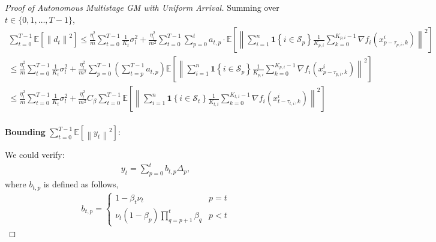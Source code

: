 \begin{proof}[Proof of Autonomous Multistage GM with Uniform Arrival]
Summing over $t\in\{0,1,\dots,T-1\}$,
\begin{equation}
\begin{gathered}
\sum_{t=0}^{T-1}\mathbb{E}\left[\left\| d_t\right\|^2\right] \leq
\frac{\eta_l^2}{m}\sum_{t=0}^{T-1}\frac{1}{K_t}\sigma^2_l + \frac{\eta_l^2}{m^2}\sum_{t=0}^{T-1} \sum_{p=0}^t a_{t,p} \cdot \mathbb{E}\left[\left\| \sum_{i=1}^n\mathbf{1}\left\{i\in\mathcal{S}_p\right\} \frac{1}{K_{p,i}} \sum_{k=0}^{K_{p,i}-1}  \nabla f_i(x_{p-\tau_{p,i},k}^i) \right\|^2\right] \\
\leq \frac{\eta_l^2}{m}\sum_{t=0}^{T-1}\frac{1}{K_t}\sigma^2_l + \frac{\eta_l^2}{m^2} \sum_{p=0}^{T-1}\left(\sum_{t=p}^{T-1}a_{t,p}\right) \mathbb{E}\left[\left\| \sum_{i=1}^n\mathbf{1}\left\{i\in\mathcal{S}_p\right\} \frac{1}{K_{p,i}} \sum_{k=0}^{K_{p,i}-1}  \nabla f_i(x_{p-\tau_{p,i},k}^i) \right\|^2\right]\\
\leq \frac{\eta_l^2}{m}\sum_{t=0}^{T-1}\frac{1}{K_t}\sigma^2_l + \frac{\eta_l^2}{m^2} C_\beta \sum_{t=0}^{T-1} \mathbb{E}\left[\left\| \sum_{i=1}^n\mathbf{1}\left\{i\in\mathcal{S}_t\right\} \frac{1}{K_{t,i}} \sum_{k=0}^{K_{t,i}-1}  \nabla f_i(x_{t-\tau_{t,i},k}^i) \right\|^2\right]\\
\end{gathered}\nonumber
\end{equation}

\textbf{Bounding} $\sum_{t=0}^{T-1}\mathbb{E}\left[\left\| y_t\right\|^2\right]$:

We could verify:
\begin{equation}
\begin{gathered}
 y_t = \sum_{p=0}^t b_{t,p}\Delta_p,  
\end{gathered}\nonumber
\end{equation}
where $b_{t,p}$ is defined as follows,
\begin{equation}
\begin{gathered}
b_{t,p}= \begin{cases} 
    1-\beta_t\nu_t  & p = t \\
    \nu_t(1-\beta_p)\prod_{q=p+1}^t\beta_q   & p < t 
   \end{cases}
\end{gathered}\nonumber   
\end{equation}


\end{proof}
